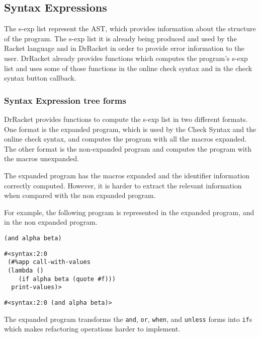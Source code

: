 \subsection{Syntax Expressions}
The s-exp list represent the AST, which provides information about
the structure of the program.
The s-exp list it is already being produced and used by the Racket language and
in DrRacket in order to provide error information to the user.
DrRacket already provides functions which computes the program's s-exp list and uses some of those
functions in the online check syntax and in the check syntax button callback.


\subsubsection{Syntax Expression tree forms}
DrRacket provides functions to compute the s-exp list in two different formats.
One format is the expanded program, which is used by the Check Syntax and
the online check syntax, and computes the program with all the macros expanded.
The other format is the non-expanded program and computes the program with the macros
unexpanded.

The expanded program has the macros expanded and the identifier information correctly
computed.
However, it is harder to extract the relevant information when compared with the
non expanded program.


For example, the following program is represented in the expanded program,
and in the non expanded program.

\begin{lstlisting}[basicstyle=\ttfamily, caption="example"]
(and alpha beta)
\end{lstlisting}

\begin{lstlisting}[basicstyle=\ttfamily, caption="Expanded program"]
#<syntax:2:0
 (#%app call-with-values
 (lambda ()
    (if alpha beta (quote #f)))
  print-values)>
\end{lstlisting}

\begin{lstlisting}[basicstyle=\ttfamily, caption="Non-expanded program"]
#<syntax:2:0 (and alpha beta)>
\end{lstlisting}


The expanded program transforms the {\tt and}, {\tt or}, {\tt when}, and {\tt unless} forms into
{\tt if}s which makes refactoring operations harder to implement.

